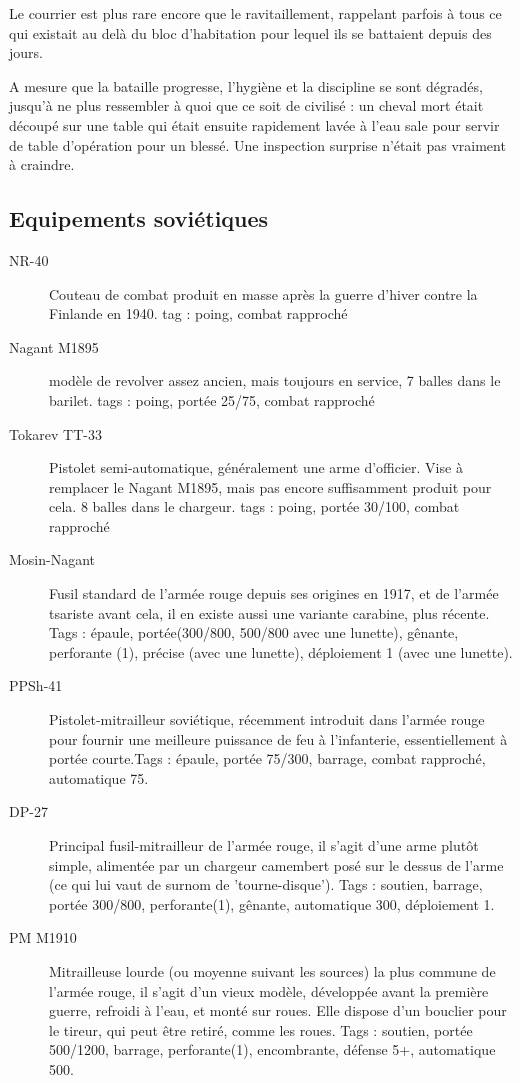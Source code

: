 \documentclass{report}
\begin{document}
\begin{multicols}{2}
Le courrier est plus rare encore que le ravitaillement, rappelant parfois à tous ce qui existait au delà du bloc d'habitation pour lequel ils se battaient depuis des jours. 

A mesure que la bataille progresse, l'hygiène et la discipline se sont dégradés, jusqu'à ne plus ressembler à quoi que ce soit de civilisé : un cheval mort était découpé sur une table qui était ensuite rapidement lavée à l'eau sale pour servir de table d'opération pour un blessé. Une inspection surprise n'était pas vraiment à craindre.
\subsection{Equipements soviétiques}
\begin{description}
\item[NR-40] Couteau de combat produit en masse après la guerre d'hiver contre la Finlande en 1940. tag : poing, combat rapproché
\item[Nagant M1895] modèle de revolver assez ancien, mais toujours en service, 7 balles dans le barilet. tags : poing, portée 25/75, combat rapproché
\item[Tokarev TT-33] Pistolet semi-automatique, généralement une arme d'officier. Vise à remplacer le Nagant M1895, mais pas encore suffisamment produit pour cela. 8 balles dans le chargeur. tags : poing, portée 30/100, combat rapproché
\item[Mosin-Nagant] Fusil standard de l'armée rouge depuis ses origines en 1917, et de l'armée tsariste avant cela, il en existe aussi une variante carabine, plus récente. Tags : épaule, portée(300/800, 500/800 avec une lunette), gênante, perforante (1), précise (avec une lunette), déploiement 1 (avec une lunette).
\item[PPSh-41]Pistolet-mitrailleur soviétique, récemment introduit dans l'armée rouge pour fournir une meilleure puissance de feu à l'infanterie, essentiellement à portée courte.Tags : épaule, portée 75/300, barrage, combat rapproché, automatique 75.
\item[DP-27]Principal fusil-mitrailleur de l'armée rouge, il s'agit d'une arme plutôt simple, alimentée par un chargeur camembert posé sur le dessus de l'arme (ce qui lui vaut de surnom de 'tourne-disque'). Tags : soutien, barrage, portée 300/800, perforante(1), gênante, automatique 300, déploiement 1.
\item[PM M1910] Mitrailleuse lourde (ou moyenne suivant les sources) la plus commune de l'armée rouge, il s'agit d'un vieux modèle, développée avant la première guerre, refroidi à l'eau, et monté sur roues. Elle dispose d'un bouclier pour le tireur, qui peut être retiré, comme les roues. Tags : soutien, portée 500/1200, barrage, perforante(1), encombrante, défense 5+, automatique 500.

\end{description}
\end{multicols}
\end{document}
